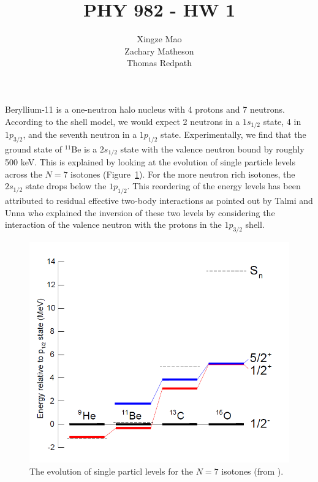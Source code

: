 \documentclass[]{scrartcl}
\title{PHY 982 - HW 1}
\author{Xingze Mao \\ Zachary Matheson \\ Thomas Redpath}
\date{}
\begin{document}
\maketitle

Beryllium-11 is a one-neutron halo nucleus with 4 protons and 7 neutrons. According to the shell model, we would expect 2 neutrons in a $1s_{1/2}$ state, 4 in $1p_{3/2}$, and the seventh neutron in a $1p_{1/2}$ state. Experimentally, we find that the ground state of $^{11}$Be is a $2s_{1/2}$ state with the valence neutron bound by roughly 500 keV. This is explained by looking at the evolution of single particle levels across the $N=7$ isotones (Figure~\ref{fig:n7isotones}). For the more neutron rich isotones, the  $2s_{1/2}$ state drops below the $1p_{1/2}$. This reordering of the energy levels has been attributed to residual effective two-body interactions as pointed out by Talmi and Unna \citep{TalmiUnna1960} who explained the inversion of these two levels by considering the interaction of the valence neutron with the protons in the $1p_{3/2}$ shell. 

\begin{figure}
\centering
	\includegraphics[width=\textwidth]{figures/n7isotones.png}
	\caption{The evolution of single particl levels for the $N=7$ isotones (from \citep{Schmitt2011}).}
	\label{fig:n7isotones}
\end{figure}



\end{document}
